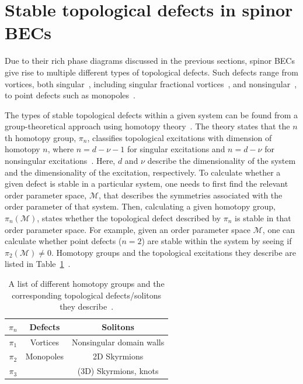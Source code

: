 \section{Stable topological defects in spinor BECs}
Due to their rich phase diagrams discussed in the previous sections, spinor BECs
give rise to multiple different types of topological defects.
Such defects range from vortices, both singular~\cite{Yip1999,Isoshima2002,
Mizushima2002, Sadler2006,Semenoff2007,Lovegrove2012,Lovegrove2016,
Borgh2016,Weiss2019,Xiao2021,Xiao2022}, including singular
fractional vortices~\cite{Leonhardt2000, Zhou2003,Ji2008,Seo2015,Semenoff2007,
Kobayashi2009,Lovegrove2012, Lovegrove2016,Borgh2016,Borgh2017,Xiao2021,
Xiao2022}, and nonsingular~\cite{Ohmi1998, Ho1998, Mizushima2002a,
Martikainen2002, Leanhardt2003, Mizushima2004, Choi2012, Choi2012a,
Lovegrove2014,Weiss2019}, to point defects such as monopoles~\cite{Stoof2001,
Savage2003,Ruostekoski2003, Pietila2009,Ray2014,Ray2015,Ollikainen2017,
Mithun2022}.

The types of stable topological defects within a given system can be
found from a group-theoretical approach using homotopy theory~\cite{Mermin1979,
Kawaguchi2012}.
The theory states that the \(n\)th homotopy group, \(\pi_n\), classifies
topological excitations with dimension of homotopy \(n\), where
\(n = d - \nu - 1\) for singular excitations and \(n=d - \nu \) for nonsingular
excitations~\cite{Kobayashi2012}.
Here, \(d\) and \(\nu \) describe the dimensionality of the system and the
dimensionality of the excitation, respectively.
To calculate whether a given defect is stable in a particular system, one needs
to first find the relevant order parameter space, \(\mathcal{M}\), that
describes the symmetries associated with the order parameter of that system.
Then, calculating a given homotopy group, \(\pi_n(\mathcal{M})\), states whether
the topological defect described by \(\pi_n\) is stable in that order parameter
space.
For example, given an order parameter space \(\mathcal{M}\), one can calculate
whether point defects (\(n=2\)) are stable within the system by seeing if
\(\pi_2(\mathcal{M}) \neq 0\).
Homotopy groups and the topological excitations they describe are listed in
Table~\ref{tab: homotopy-groups}~\cite{Kawaguchi2012}.
\begin{table}
    \centering
    \begin{tabular}{ccc}
        \toprule
        \(\pi_n\) & Defects & Solitons \\
        \midrule
        \(\pi_1 \) & Vortices & Nonsingular domain walls \\
        \(\pi_2 \) & Monopoles & 2D Skyrmions \\
        \(\pi_3 \) &  & (3D) Skyrmions, knots \\
        \bottomrule
    \end{tabular}
    \caption[Homotopy groups and the topological excitations they describe]
    {\label{tab: homotopy-groups}A list of different homotopy groups
    and the corresponding topological defects/solitons they
    describe~\cite{Kawaguchi2012}.}
\end{table}

